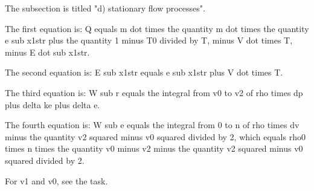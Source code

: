 The subsection is titled "d) stationary flow processes".

The first equation is:
Q equals m dot times the quantity m dot times the quantity e sub x1str plus the quantity 1 minus T0 divided by T, minus V dot times T, minus E dot sub x1str.

The second equation is:
E sub x1str equals e sub x1str plus V dot times T.

The third equation is:
W sub r equals the integral from v0 to v2 of rho times dp plus delta ke plus delta e.

The fourth equation is:
W sub e equals the integral from 0 to n of rho times dv minus the quantity v2 squared minus v0 squared divided by 2, which equals rho0 times n times the quantity v0 minus v2 minus the quantity v2 squared minus v0 squared divided by 2.

For v1 and v0, see the task.